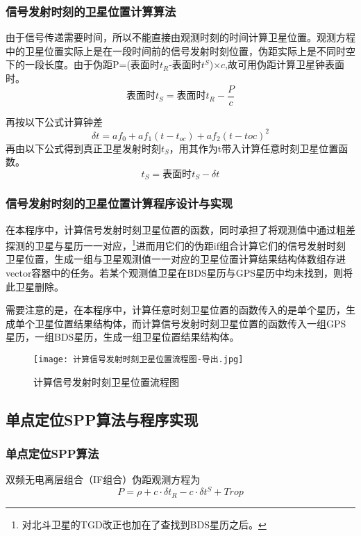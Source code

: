 \documentclass{ctexart}
\begin{document}
\subsubsection{信号发射时刻的卫星位置计算算法}
由于信号传递需要时间，所以不能直接由观测时刻的时间计算卫星位置。观测方程中的卫星位置实际上是在一段时间前的信号发射时刻位置，伪距实际上是不同时空下的一段长度。由于伪距P=(表面时$t_R$-表面时$t^S$)$\times c$,故可用伪距计算卫星钟表面时。
\begin{equation}
\mbox{表面时} t_S=\mbox{表面时}t_R-\frac{P}{c}
\end{equation}

再按以下公式计算钟差
\begin{equation}
\delta t=af_0+af_1(t-t_{oc})+af_2(t-t{oc})^2
\end{equation}
再由以下公式得到真正卫星发射时刻$t_S$，用其作为t带入计算任意时刻卫星位置函数。
\begin{equation}
t_S=\mbox{表面时} t_S-\delta t
\end{equation}

\subsubsection{信号发射时刻的卫星位置计算程序设计与实现}
在本程序中，计算信号发射时刻卫星位置的函数，同时承担了将观测值中通过粗差探测的卫星与星历一一对应，\footnote{对北斗卫星的TGD改正也加在了查找到BDS星历之后。}进而用它们的伪距if组合计算它们的信号发射时刻卫星位置，生成一组与卫星观测值一一对应的卫星位置计算结果结构体数组存进vector容器中的任务。若某个观测值卫星在BDS星历与GPS星历中均未找到，则将此卫星删除。

需要注意的是，在本程序中，计算任意时刻卫星位置的函数传入的是单个星历，生成单个卫星位置结果结构体，而计算信号发射时刻卫星位置的函数传入一组GPS星历，一组BDS星历，生成一组卫星位置结果结构体。
\begin{figure}[H]
\texttt{[image: 计算信号发射时刻卫星位置流程图-导出.jpg]}
\caption{计算信号发射时刻卫星位置流程图}
\end{figure}

\subsection{单点定位SPP算法与程序实现}
\subsubsection{单点定位SPP算法}
双频无电离层组合（IF组合）伪距观测方程为
\begin{equation}
P=\rho+c\cdot\delta t_R-c\cdot \delta t^S +Trop
\end{equation}
\end{document}
